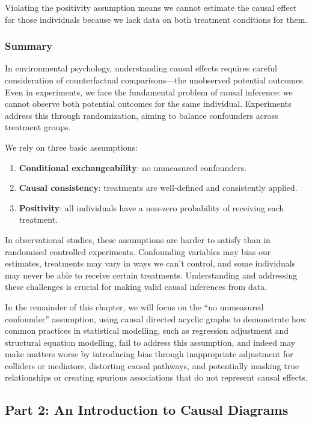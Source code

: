 \documentclass[
  singlecolumn]{article}
\providecommand{\tightlist}{%
  \setlength{\itemsep}{0pt}\setlength{\parskip}{0pt}}\usepackage{longtable,booktabs,array}
\begin{document}
Violating the positivity assumption means we cannot estimate the causal
effect for those individuals because we lack data on both treatment
conditions for them.

\subsubsection{Summary}\label{summary}

In environmental psychology, understanding causal effects requires
careful consideration of counterfactual comparisons---the unobserved
potential outcomes. Even in experiments, we face the fundamental problem
of causal inference: we cannot observe both potential outcomes for the
same individual. Experiments address this through randomization, aiming
to balance confounders across treatment groups.

We rely on three basic assumptions:

\begin{enumerate}
\def\labelenumi{\arabic{enumi}.}
\tightlist
\item
  \textbf{Conditional exchangeability}: no unmeasured confounders.
\item
  \textbf{Causal consistency}: treatments are well-defined and
  consistently applied.
\item
  \textbf{Positivity}: all individuals have a non-zero probability of
  receiving each treatment.
\end{enumerate}

In observational studies, these assumptions are harder to satisfy than
in randomised controlled experiments. Confounding variables may bias our
estimates, treatments may vary in ways we can't control, and some
individuals may never be able to receive certain treatments.
Understanding and addressing these challenges is crucial for making
valid causal inferences from data.

In the remainder of this chapter, we will focus on the ``no unmeasured
confounder'' assumption, using causal directed acyclic graphs to
demonstrate how common practices in statistical modelling, such as
regression adjustment and structural equation modelling, fail to address
this assumption, and indeed may make matters worse by introducing bias
through inappropriate adjustment for colliders or mediators, distorting
causal pathways, and potentially masking true relationships or creating
spurious associations that do not represent causal effects.

\subsection{Part 2: An Introduction to Causal
Diagrams}\label{section-part2}
\end{document}
